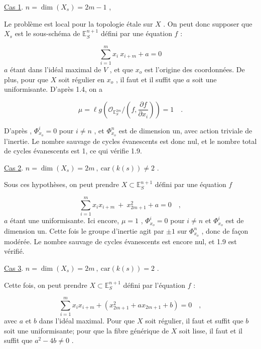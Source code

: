 \underline{Cas 1}. \quad \underline{$n = \dim(X_s) = 2m - 1$} ,

Le problème est local pour la topologie étale sur $X$ . On peut donc supposer que $X_s$ est le sous-schéma de $\mathbb{E}_S^{n+1}$ défini par une équation $f$ :

\begin{equation*}
\sum_{i=1}^{m} x_i \ x_{i+m} + a = 0
\end{equation*}
$a$ étant dans l'idéal maximal de $V$ , et que $x_o$ est l'origine des coordonnées. De plus, pour que $X$ soit régulier en $x_o$ , il faut et il suffit que $a$ soit une uniformisante. D'après 1.4, on a

\begin{equation*}
\mu = \ell g(\mathcal{O}_{\mathbb{E}_S^{2m}} / (f, \frac{\partial f}{\partial x_i})) = 1 \quad .
\end{equation*}


D'après \hspace{2.5cm} , $\Phi^i_{x_o} = 0$ pour $i \neq n$ , et $\Phi^n_{x_o}$ est de dimension un, avec action triviale de l'inertie. Le nombre sauvage de cycles évanescents est donc nul, et le nombre total de cycles évanescents est 1, ce qui vérifie 1.9.

\underline{Cas 2}. \quad \underline{$n = \dim(X_s) = 2m \ , \ \mathrm{car}(k(s)) \neq 2$} .

Sous ces hypothèses, on peut prendre $X \subset \mathbb{E}_S^{n+1}$ défini par une équation $f$

\begin{equation*}
\sum_{i=1}^{m} x_ix_{i+m} \ + \ x_{2m+1}^2 + a = 0 \quad ,
\end{equation*}
$a$ étant une uniformisante. Ici encore, $\mu = 1$ , $\Phi^i_{x_o} = 0$ pour $i \neq n$ et $\Phi^i_{x_o}$ est de dimension un. Cette fois le groupe d'inertie agit par $\pm 1$ sur $\Phi^n_{x_o}$ , donc de façon modérée. Le nombre sauvage de cycles évanescents est encore nul, et 1.9 est vérifié.

\underline{Cas 3}. \quad \underline{$n = \dim(X_s) = 2m \ , \ \mathrm{car}(k(s)) = 2$} .

Cette fois, on peut prendre $X \subset \mathbb{E}_S^{n+1}$ défini par l'équation $f$ :

\begin{equation*}
\sum_{i=1}^{m} x_ix_{i+m} + (x_{2m+1}^2 + ax_{2m+1} + b) = 0 \quad ,
\end{equation*}
avec $a$ et $b$ dans l'idéal maximal. Pour que $X$ soit régulier, il faut et suffit que $b$ soit une uniformisante; pour que la fibre générique de $X$ soit lisse, il faut et il suffit que $a^2 - 4b \neq 0$ .

